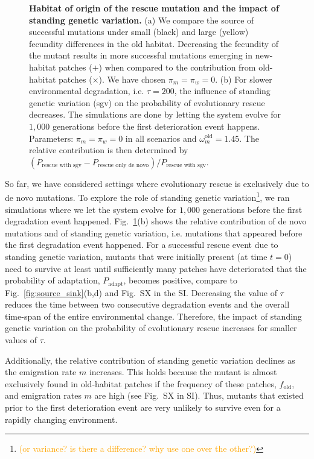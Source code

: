 \documentclass[11pt]{article}
\newcommand{\pete}[1]{\textcolor{orange}{(#1)}}
\newcommand{\chg}[1]{\textcolor{change}{#1}}
\begin{document}
\begin{figure}[t]
	\caption{\textbf{Habitat of origin of the rescue mutation and the impact of standing genetic variation.} \small (a) We compare the source of successful mutations under small (black) and large (yellow) fecundity differences in the old habitat. Decreasing the fecundity of the mutant results in more successful mutations emerging in new-habitat patches ($+$) when compared to the contribution from old-habitat patches ($\times$). We have chosen $\pi_m=\pi_w=0$. (b) For slower environmental degradation, i.e. $\tau=200$, the influence of standing genetic variation (sgv) on the probability of evolutionary rescue decreases. The simulations are done by letting the system evolve for $1,000$ generations before the first deterioration event happens. Parameters: $\pi_m=\pi_w=0$ in all scenarios and $\omega^\text{old}_m=1.45$. The relative contribution is then determined by $(P_{\text{rescue with sgv}}-P_{\text{rescue only de novo}})/P_{\text{rescue with sgv}}$.}
	\label{fig:sgv}
\end{figure}

So far, we have considered settings where evolutionary rescue is exclusively due to de novo mutations. To explore the role of standing genetic variation\footnote{\pete{or variance? is there a difference? why use one over the other?}}, we ran simulations where we let the system evolve for $1,000$ generations before the first degradation event happened. Fig.~\ref{fig:sgv}(b) shows the relative contribution of de novo mutations and of standing genetic variation, i.e. mutations that appeared before the first degradation event happened. \chg{For a successful rescue event due to standing genetic variation, mutants that were initially present (at time $t=0$) need to survive at least until sufficiently many patches have deteriorated that the probability of adaptation, $P_{\text{adapt}}$, becomes positive, compare to Fig.~\ref{fig:source_sink}(b,d) and Fig.~SX in the SI.} \chg{Decreasing the value of $\tau$ reduces the time between two consecutive degradation events and the overall time-span of the entire environmental change. Therefore, the impact of standing genetic variation on the probability of evolutionary rescue increases for smaller values of $\tau$.}

Additionally, the relative contribution of standing genetic variation declines as the emigration rate $m$ increases. 
This holds because \chg{the mutant is almost exclusively found in old-habitat patches if the frequency of these patches, $f_{\text{old}}$, and emigration rates $m$ are high} (see Fig.~SX in SI). Thus, mutants that existed prior to the first deterioration event are very unlikely to survive even for a rapidly changing environment. 
\end{document}
